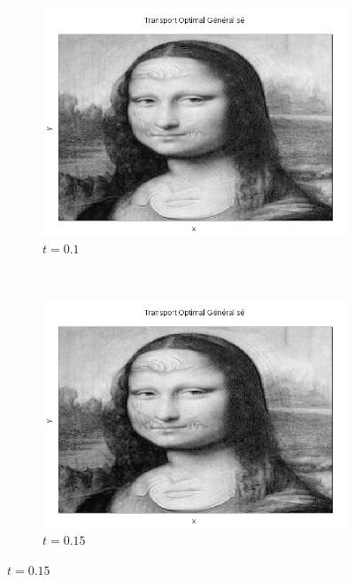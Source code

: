 \documentclass[a4paper,12pt]{article}
\begin{document}
\begin{figure}[!h]
\begin{subfigure}[b]{0.23\linewidth}
\includegraphics[width=\linewidth]{img/2DMorphing/T_00023.png}
\caption*{$t=0.1$}
\end{subfigure}
~
\begin{subfigure}[b]{0.23\linewidth}
\includegraphics[width=\linewidth]{img/2DMorphing/T_00034.png}
\caption*{$t=0.15$}
\end{subfigure}


\end{figure}
\end{document}
